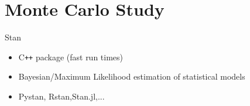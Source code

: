 \section{Monte Carlo Study}


\begin{frame}{Stan}
  \Large{
  \begin{itemize}
      \item[]  C\texttt{++} package (fast run times)\pause
      \item[]  Bayesian/Maximum Likelihood estimation of statistical models\pause
      \item[]  Pystan, Rstan,Stan.jl,...
   \end{itemize}
  }
\end{frame}

